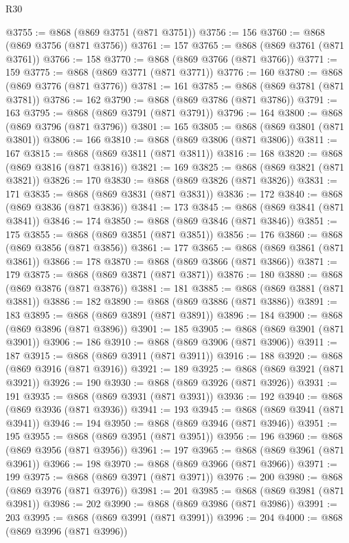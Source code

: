 \begin{lexlean}{R30}
\begin{coremodule}
@3755 := @868 (@869 @3751 (@871 @3751))
@3756 := 156
@3760 := @868 (@869 @3756 (@871 @3756))
@3761 := 157
@3765 := @868 (@869 @3761 (@871 @3761))
@3766 := 158
@3770 := @868 (@869 @3766 (@871 @3766))
@3771 := 159
@3775 := @868 (@869 @3771 (@871 @3771))
@3776 := 160
@3780 := @868 (@869 @3776 (@871 @3776))
@3781 := 161
@3785 := @868 (@869 @3781 (@871 @3781))
@3786 := 162
@3790 := @868 (@869 @3786 (@871 @3786))
@3791 := 163
@3795 := @868 (@869 @3791 (@871 @3791))
@3796 := 164
@3800 := @868 (@869 @3796 (@871 @3796))
@3801 := 165
@3805 := @868 (@869 @3801 (@871 @3801))
@3806 := 166
@3810 := @868 (@869 @3806 (@871 @3806))
@3811 := 167
@3815 := @868 (@869 @3811 (@871 @3811))
@3816 := 168
@3820 := @868 (@869 @3816 (@871 @3816))
@3821 := 169
@3825 := @868 (@869 @3821 (@871 @3821))
@3826 := 170
@3830 := @868 (@869 @3826 (@871 @3826))
@3831 := 171
@3835 := @868 (@869 @3831 (@871 @3831))
@3836 := 172
@3840 := @868 (@869 @3836 (@871 @3836))
@3841 := 173
@3845 := @868 (@869 @3841 (@871 @3841))
@3846 := 174
@3850 := @868 (@869 @3846 (@871 @3846))
@3851 := 175
@3855 := @868 (@869 @3851 (@871 @3851))
@3856 := 176
@3860 := @868 (@869 @3856 (@871 @3856))
@3861 := 177
@3865 := @868 (@869 @3861 (@871 @3861))
@3866 := 178
@3870 := @868 (@869 @3866 (@871 @3866))
@3871 := 179
@3875 := @868 (@869 @3871 (@871 @3871))
@3876 := 180
@3880 := @868 (@869 @3876 (@871 @3876))
@3881 := 181
@3885 := @868 (@869 @3881 (@871 @3881))
@3886 := 182
@3890 := @868 (@869 @3886 (@871 @3886))
@3891 := 183
@3895 := @868 (@869 @3891 (@871 @3891))
@3896 := 184
@3900 := @868 (@869 @3896 (@871 @3896))
@3901 := 185
@3905 := @868 (@869 @3901 (@871 @3901))
@3906 := 186
@3910 := @868 (@869 @3906 (@871 @3906))
@3911 := 187
@3915 := @868 (@869 @3911 (@871 @3911))
@3916 := 188
@3920 := @868 (@869 @3916 (@871 @3916))
@3921 := 189
@3925 := @868 (@869 @3921 (@871 @3921))
@3926 := 190
@3930 := @868 (@869 @3926 (@871 @3926))
@3931 := 191
@3935 := @868 (@869 @3931 (@871 @3931))
@3936 := 192
@3940 := @868 (@869 @3936 (@871 @3936))
@3941 := 193
@3945 := @868 (@869 @3941 (@871 @3941))
@3946 := 194
@3950 := @868 (@869 @3946 (@871 @3946))
@3951 := 195
@3955 := @868 (@869 @3951 (@871 @3951))
@3956 := 196
@3960 := @868 (@869 @3956 (@871 @3956))
@3961 := 197
@3965 := @868 (@869 @3961 (@871 @3961))
@3966 := 198
@3970 := @868 (@869 @3966 (@871 @3966))
@3971 := 199
@3975 := @868 (@869 @3971 (@871 @3971))
@3976 := 200
@3980 := @868 (@869 @3976 (@871 @3976))
@3981 := 201
@3985 := @868 (@869 @3981 (@871 @3981))
@3986 := 202
@3990 := @868 (@869 @3986 (@871 @3986))
@3991 := 203
@3995 := @868 (@869 @3991 (@871 @3991))
@3996 := 204
@4000 := @868 (@869 @3996 (@871 @3996))

\end{coremodule}
\end{lexlean}
